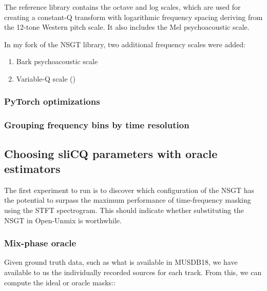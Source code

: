 \documentclass[report.tex]{subfiles}
\begin{document}
The reference library contains the octave and log scales, which are used for creating a constant-Q transform with logarithmic frequency spacing deriving from the 12-tone Western pitch scale. It also includes the Mel psychoacoustic scale.

In my fork of the NSGT library, two additional frequency scales were added:

\begin{enumerate}
	\item
		Bark psychoacoustic scale
	\item
		Variable-Q scale (\cite{variableq1,variableq2})
\end{enumerate}


\subsubsection{PyTorch optimizations}




\subsubsection{Grouping frequency bins by time resolution}


\subsection{Choosing sliCQ parameters with oracle estimators}

The first experiment to run is to discover which configuration of the NSGT has the potential to surpass the maximum performance of time-frequency masking using the STFT spectrogram. This should indicate whether substituting the NSGT in Open-Unmix is worthwhile.

\subsubsection{Mix-phase oracle}

Given ground truth data, such as what is available in MUSDB18, we have available to us the individually recorded sources for each track. From this, we can compute the ideal or oracle masks::
\end{document}
